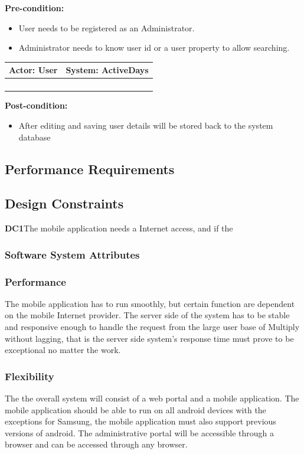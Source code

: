 \documentclass[11pt]{article}
\begin{document}
\textbf{Pre-condition: }   \\
\begin{itemize}
	\item User needs to be registered as an Administrator.
	\item Administrator needs to know user id or a user property to allow searching. 
\end{itemize}
\begin{center}
	\begin{tabular}{ |p{8cm}|p{8cm}| }
		\hline
		\textbf{Actor:} User & \textbf{System:} ActiveDays \\
		\hline
		&  \\
		\hline
		&  \\
		\hline
		& \\   
		\hline
		& \\
		\hline
	\end{tabular}
\end{center}		
\textbf{Post-condition: } \\
\begin{itemize}
	\item After editing and saving user details will be stored back to the system database
\end{itemize}

\subsection{Performance Requirements}

\subsection{Design Constraints}
\textbf{DC1}The mobile application needs a Internet access, and if the 
\subsubsection{Software System Attributes}
\subsubsection{Performance}
The mobile application has to run smoothly, but certain function are dependent on the mobile Internet provider. The server side of the system has to be stable and responsive enough to handle the request from the large user base of Multiply without lagging, that is the server side system's response time must prove to be exceptional no matter the work.
\subsubsection{Flexibility}
The the overall system will consist of a web portal and a mobile application. The mobile application should be able to run on all android devices with the exceptions for Samsung, the mobile application must also support previous versions of android. The administrative portal will be accessible through a browser and can be accessed through any browser.
\end{document}
